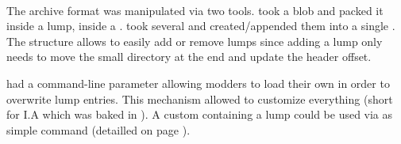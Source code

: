 \par
{}
\par
{}\\
\par
{}
\par
The archive format was manipulated via two tools.  took a blob and packed it inside a lump, inside a .  took several  and created/appended them into a single . The structure allows to easily add or remove lumps since adding a lump only needs to move the small directory at the end and update the header offset.\\
\par
\doom{} had a command-line parameter allowing modders to load their own  in order to overwrite  lump entries. This mechanism allowed to customize everything (short for I.A which was baked in ). A custom  containing a  lump could be used via as simple  command (detailled on page \pageref{wad_detailled}).




